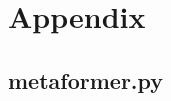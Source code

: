 \chapter{Appendix}
\label{sec:appendix}



% 

\newpage
\section*{metaformer.py} \label{appendix:programTest}
    \inputminted[firstline=2, lastline=12]{python}{./../physics-code/models/metaformer.py}
